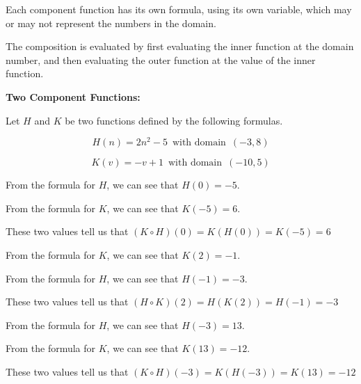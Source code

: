 \documentclass{ximera}
\begin{document}
Each component function has its own formula, using its own variable, which may or may not represent the numbers in the domain.

The composition is evaluated by first evaluating the inner function at the domain number, and then evaluating the outer function at the value of the inner function.




\textbf{Two Component Functions:}


Let $H$ and $K$ be two functions defined by the following formulas.

\[
H(n) = 2 n^2 - 5 \,  \text{ with domain }  \,  (-3, 8)
\]


\[
K(v) = -v + 1 \,  \text{ with domain }  \,  (-10, 5)
\]





\begin{example}

From the formula for $H$, we can see that $H(0) = -5$.

From the formula for $K$, we can see that $K(-5) = 6$.

These two values tell us that $(K \circ H)(0) = K(H(0)) = K(-5) = 6$

\end{example}






\begin{example}

From the formula for $K$, we can see that $K(2) = -1$.

From the formula for $H$, we can see that $H(-1) = -3$.

These two values tell us that $(H \circ K)(2) = H(K(2)) = H(-1) = -3$

\end{example}









\begin{example}

From the formula for $H$, we can see that $H(-3) = 13$.

From the formula for $K$, we can see that $K(13) = -12$.

These two values tell us that $(K \circ H)(-3) = K(H(-3)) = K(13) = -12$

\end{example}
\end{document}
